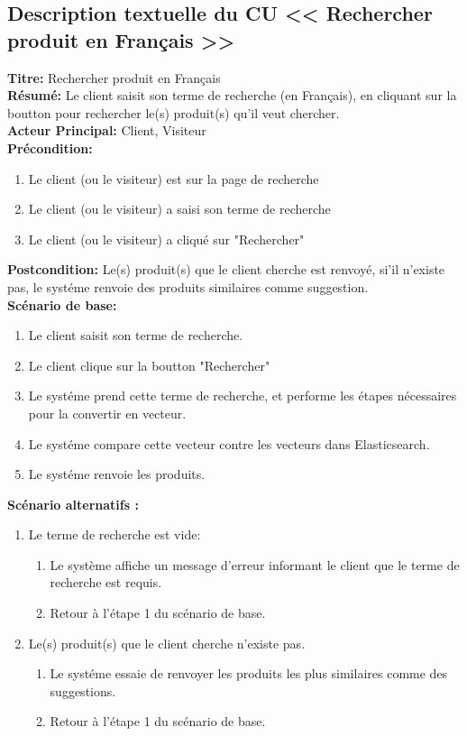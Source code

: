 \subsection{Description textuelle du CU << Rechercher produit en Français >>}
\noindent
\textbf{Titre:} Rechercher produit en Français \\
\textbf{Résumé:} Le client saisit son terme de recherche (en Français), en cliquant sur la boutton pour rechercher le(s) produit(s) qu'il veut chercher. \\
\textbf{Acteur Principal:} Client, Visiteur \\
\textbf{Précondition:} \begin{enumerate}
	\item Le client (ou le visiteur) est sur la page de recherche
	\item Le client (ou le visiteur) a saisi son terme de recherche
	\item Le client (ou le visiteur) a cliqué sur "Rechercher"
\end{enumerate}
\textbf{Postcondition:} Le(s) produit(s) que le client cherche est renvoyé, si'il n'existe pas, le systéme renvoie des produits similaires comme suggestion. \\
\textbf{Scénario de base: }
\begin{enumerate}
	\item Le client saisit son terme de recherche.
	\item Le client clique sur la boutton "Rechercher"
	\item Le systéme prend cette terme de recherche, et performe les étapes nécessaires pour la convertir en vecteur.
	\item Le systéme compare cette vecteur contre les vecteurs dans Elasticsearch.
	\item Le systéme renvoie les produits.
\end{enumerate}

\textbf{Scénario alternatifs : }
\begin{enumerate}
	\item Le terme de recherche est vide:
	      \begin{enumerate}
		      \item Le système affiche un message d'erreur informant le client que le terme de recherche est requis.
		      \item Retour à l'étape 1 du scénario de base.
	      \end{enumerate}

	\item Le(s) produit(s) que le client cherche n'existe pas.
	      \begin{enumerate}
		      \item Le systéme essaie de renvoyer les produits les plus similaires comme des suggestions.
		      \item Retour à l'étape 1 du scénario de base.
	      \end{enumerate}
\end{enumerate}

